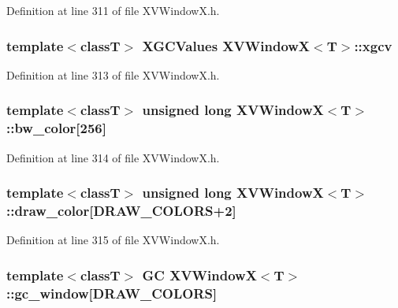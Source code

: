 Definition at line 311 of file XVWindow\-X.h.\label{XVWindowX_n11}
\hypertarget{class_XVWindowX_n11}{
\subsubsection[xgcv]{\setlength{\rightskip}{0pt plus 5cm}template$<$classT$>$ XGCValues XVWindow\-X$<$T$>$::xgcv}}




Definition at line 313 of file XVWindow\-X.h.\label{XVWindowX_n12}
\hypertarget{class_XVWindowX_n12}{
\subsubsection[bw_color]{\setlength{\rightskip}{0pt plus 5cm}template$<$classT$>$ unsigned long XVWindow\-X$<$T$>$::bw\_\-color\mbox{[}256\mbox{]}}}




Definition at line 314 of file XVWindow\-X.h.\label{XVWindowX_n13}
\hypertarget{class_XVWindowX_n13}{
\subsubsection[draw_color]{\setlength{\rightskip}{0pt plus 5cm}template$<$classT$>$ unsigned long XVWindow\-X$<$T$>$::draw\_\-color\mbox{[}DRAW\_\-COLORS+2\mbox{]}}}




Definition at line 315 of file XVWindow\-X.h.\label{XVWindowX_n14}
\hypertarget{class_XVWindowX_n14}{
\subsubsection[gc_window]{\setlength{\rightskip}{0pt plus 5cm}template$<$classT$>$ GC XVWindow\-X$<$T$>$::gc\_\-window\mbox{[}DRAW\_\-COLORS\mbox{]}}}




